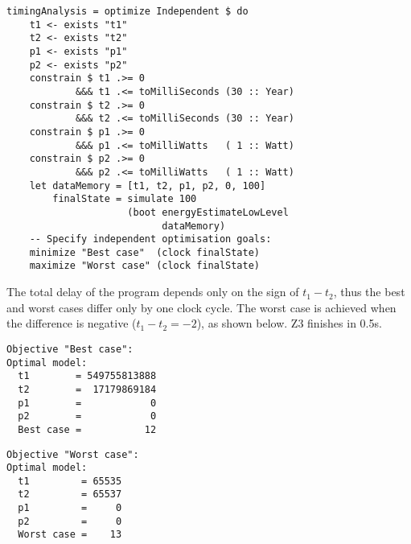 \begin{verbatim}
timingAnalysis = optimize Independent $ do
    t1 <- exists "t1"
    t2 <- exists "t2"
    p1 <- exists "p1"
    p2 <- exists "p2"
    constrain $ t1 .>= 0
            &&& t1 .<= toMilliSeconds (30 :: Year)
    constrain $ t2 .>= 0
            &&& t2 .<= toMilliSeconds (30 :: Year)
    constrain $ p1 .>= 0
            &&& p1 .<= toMilliWatts   ( 1 :: Watt)
    constrain $ p2 .>= 0
            &&& p2 .<= toMilliWatts   ( 1 :: Watt)
    let dataMemory = [t1, t2, p1, p2, 0, 100]
        finalState = simulate 100
                     (boot energyEstimateLowLevel
                           dataMemory)
    -- Specify independent optimisation goals:
    minimize "Best case"  (clock finalState)
    maximize "Worst case" (clock finalState)
\end{verbatim}


\noindent
The total delay of the program depends only on the sign of $t_1 - t_2$, thus
the best and worst cases differ only by one clock cycle. The worst case is
achieved when the difference is negative ($t_1 - t_2 = -2$), as shown below.
Z3 finishes in 0.5s.


\begin{verbatim}
Objective "Best case":
Optimal model:
  t1        = 549755813888
  t2        =  17179869184
  p1        =            0
  p2        =            0
  Best case =           12
\end{verbatim}
\begin{verbatim}
Objective "Worst case":
Optimal model:
  t1         = 65535
  t2         = 65537
  p1         =     0
  p2         =     0
  Worst case =    13
\end{verbatim}

